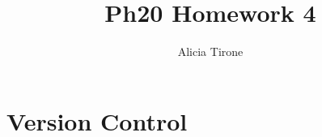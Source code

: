 \documentclass{article}
\title{Ph20 Homework 4}
\author{Alicia Tirone}
\begin{document}
\maketitle

\section{Version Control}



\end{document}
